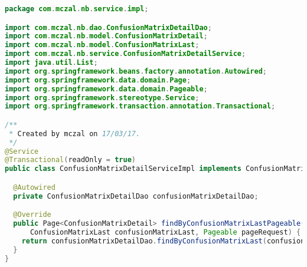 \begin{lstlisting}[language=Java,basicstyle=\tiny,caption=ConfusionMatrixDetailServiceImpl.java]
package com.mczal.nb.service.impl;

import com.mczal.nb.dao.ConfusionMatrixDetailDao;
import com.mczal.nb.model.ConfusionMatrixDetail;
import com.mczal.nb.model.ConfusionMatrixLast;
import com.mczal.nb.service.ConfusionMatrixDetailService;
import java.util.List;
import org.springframework.beans.factory.annotation.Autowired;
import org.springframework.data.domain.Page;
import org.springframework.data.domain.Pageable;
import org.springframework.stereotype.Service;
import org.springframework.transaction.annotation.Transactional;

/**
 * Created by mczal on 17/03/17.
 */
@Service
@Transactional(readOnly = true)
public class ConfusionMatrixDetailServiceImpl implements ConfusionMatrixDetailService {

  @Autowired
  private ConfusionMatrixDetailDao confusionMatrixDetailDao;

  @Override
  public Page<ConfusionMatrixDetail> findByConfusionMatrixLastPageable(
      ConfusionMatrixLast confusionMatrixLast, Pageable pageRequest) {
    return confusionMatrixDetailDao.findByConfusionMatrixLast(confusionMatrixLast, pageRequest);
  }
}

\end{lstlisting}


